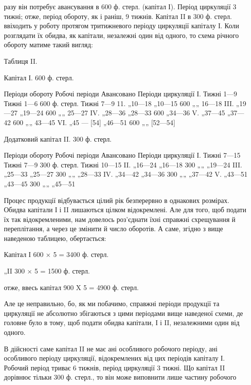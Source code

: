 \parcont{}  %
разу він потребує авансування в 600 ф. стерл. (капітал І). Період циркуляції
3 тижні; отже, період обороту, як і раніш, 9 тижнів. Капітал II
в 300 ф. стерл. ввіходить у роботу протягом тритижневого періоду циркуляції
капіталу І. Коли розглядати їх обидва, як капітали, незалежні
один від одного, то схема річного обороту матиме такий вигляд:

Таблиця II.

Капітал І. 600 ф. стерл.

Періоди обороту    Робочі періоди    Авансовано    Періоди циркуляції
І. Тижні 1—9    Тижні 1—6    600 ф. стерл. Тижні 7—9
11. „10—18 „10—15    600 „„ 16—18
III. „19—27 „19—24    600 „„ 25—27
IV. „28—36 „28—33    600 „34—36
V. „37—45 „37—42    600 „„ 43—45
VI. „45 — [54] „46—51    600 „„ [52—54]

Додатковий капітал II. 300 ф. стерл.

Періоди обороту    Робочі періоди    Авансовано    Періоди циркуляції
І. Тижні 7—15    Тижні 7—9    300 ф. стерл. Тижні 10—15
II. „16—24 „16—18    300 „„ „19—24
III. „25—33 „25—27    300 „„ „28—33
IV. „34—42 „34—36    300 „„ „37—42
V. „43—51 „43—45    300 „„ „45—51

Процес продукції відбувається цілий рік безперервно в однакових
розмірах. Обидва капітали І і II лишаються цілком відокремлені. Але
для того, щоб подати їх так відокремленими, нам довелось роз’єднати
їхні справжні схрещування й переплітання, а через це змінити й число
оборотів. А саме, згідно з вище наведеною таблицею, обертається:

Капітал І 600 × 5 = 3400 ф. стерл.

„II 300 × 5 = 1500 ф. стерл.

отже, ввесь капітал    900 X 5 = 4900 ф. стерл.

Але це неправильно, бо, як ми побачимо, справжні періоди продукції
та циркуляції не абсолютно збігаються з цими періодами вище наведеної
схеми, де головне було в тому, щоб подати обидва капітали, І і II, незалежними
один від одного.

В дійсності саме капітал II не має ані особливого робочого періоду, ані особливого
періоду циркуляції, відокремлених від цих періодів капіталу І. Робочий
період триває 6 тижнів, період циркуляції 3 тижні. Що капітал II дорівнює
тільки 300 ф. стерл., то він може виповнити лише частину робочого
\parbreak{}  %
